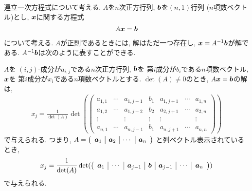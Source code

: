 連立一次方程式について考える.
$A$を$n$次正方行列, $\boldsymbol{b}$を$(n,1)$行列 ($n$項数ベクトル)とし,
$\boldsymbol{x}$に関する方程式
\begin{align*}
A\boldsymbol{x}=\boldsymbol{b}
\end{align*}
について考える.
$A$が正則であるときには,
解はただ一つ存在し,
$\boldsymbol{x}=A^{-1}\boldsymbol{b}$が解である.
$A^{-1}\boldsymbol{b}$は次のように表すことができる.
\begin{theorem}
  $A$を
  $(i,j)$-成分が$a_{i,j}$である$n$次正方行列,
  $\boldsymbol{b}$を
  第$i$成分が$b_i$である$n$項数ベクトル,
  $\boldsymbol{x}$を
  第$i$成分が$x_i$である$n$項数ベクトルとする.
  $\det(A)\neq 0$のとき, $A\boldsymbol{x}=\boldsymbol{b}$の解は,
  \begin{align*}
    x_j=\frac{1}{\det(A)}
    \det(\begin{pmatrix}
      a_{1,1}&\cdots&a_{1,j-1}&b_1&a_{1,j+1}&\cdots&a_{1,n}\\
      a_{1,2}&\cdots&a_{1,j-2}&b_2&a_{2,j+1}&\cdots&a_{2,n}\\
      \vdots&&\vdots&\vdots&\vdots&&\vdots\\
      a_{n,1}&\cdots&a_{n,j-1}&b_1&a_{n,j+1}&\cdots&a_{n,n}
      \end{pmatrix})
  \end{align*}
  で与えられる.
  つまり,
  $A=\left(\begin{array}{c|c|c|c}\boldsymbol{a}_1&\boldsymbol{a}_2&\cdots&\boldsymbol{a}_n\end{array}\right)$
  と列ベクトル表示されているとき,
  \begin{align*}
    x_j=\frac{1}{\det(A)}
    \det(
    \left(\begin{array}{c|c|c|c|c|c|c}
      \boldsymbol{a}_1&\cdots&\boldsymbol{a}_{j-1}&\boldsymbol{b}&\boldsymbol{a}_{j-1}&\cdots&\boldsymbol{a}_n
    \end{array}\right))
  \end{align*}
  で与えられる.
\end{theorem}

